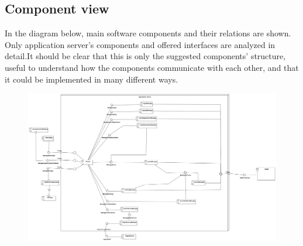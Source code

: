 \documentclass{article}
\begin{document}
\subsection{Component view}
In the diagram below, main software components and their relations are shown. Only application server's
components and offered interfaces are analyzed in detail.It should be clear that this is only the
suggested components' structure, useful to understand how the components communicate with each other,
and that it could be implemented in many different ways.
\begin{figure}[H]
  \includegraphics[width=\linewidth]{ComponentDiagram.png}
  
\end{figure}
\end{document}
